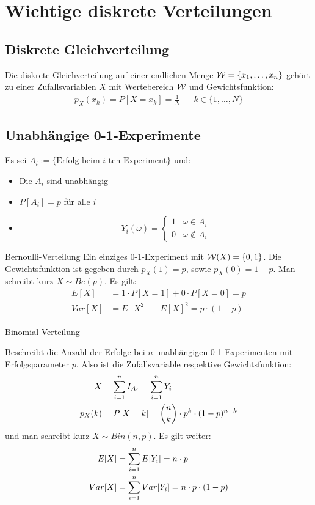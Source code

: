 {\section{Wichtige diskrete Verteilungen}}
\subsection*{Diskrete Gleichverteilung}
Die diskrete Gleichverteilung auf einer endlichen Menge $\mathcal{W} = \{ x_1, \dots,
  x_n \}$ gehört zu einer Zufallsvariablen $X$ mit Wertebereich $\mathcal{W}$ und
Gewichtsfunktion:
\begin{align*}
  p_X (x_k) = P[X = x_k] = \frac{1}{N} &  & k \in \{1, \dots, N\}
\end{align*}
\subsection*{Unabhängige 0-1-Experimente}
Es sei $A_i := \{\text{Erfolg beim $i$-ten Experiment}\}$ und:
\begin{itemize}
  \item Die $A_i$ sind unabhängig
  \item $P[A_i] = p$ für alle $i$
  \item \[
          Y_i (\omega) =
          \begin{cases}
            1 & \omega \in A_i      \\
            0 & \omega \not \in A_i
          \end{cases}
        \]
\end{itemize}
\begin{definition}{Bernoulli-Verteilung}
Ein einziges 0-1-Experiment mit $\mathcal{W} (X) = \{0, 1\}$. Die Gewichtsfunktion ist
gegeben durch $p_X (1) = p$, sowie $p_X (0) = 1-p$. Man schreibt kurz $X \sim
  Be (p)$. Es gilt:
\begin{align*}
  E[X]   & = 1 \cdot P[X = 1] + 0 \cdot P[X = 0] = p \\
  Var[X] & = E[X^2] - {E[X]}^2 = p \cdot  (1-p)
\end{align*}
\end{definition}
\begin{definition}{Binomial Verteilung}

Beschreibt die Anzahl der Erfolge bei $n$ unabhängigen 0-1-Experimenten mit
Erfolgsparameter $p$. Also ist die Zufallsvariable respektive Gewichtsfunktion:
\begin{align*}
  X       & = \sum_{i = 1}^n I_{A_i} = \sum_{i = 1}^n Y_i                                \\
  p_X (k) & = P[X = k] = \binom{n}{k} \cdot p^k \cdot  (1-p)^{n-k}
\end{align*}
und man schreibt kurz $X \sim Bin (n, p)$. Es gilt weiter:
\begin{align*}
  E[X]   & = \sum_{i = 1}^n E[Y_i] = n \cdot p                \\
  Var[X] & = \sum_{i = 1}^n Var[Y_i] = n \cdot p \cdot  (1-p)
\end{align*}
\end{definition}
